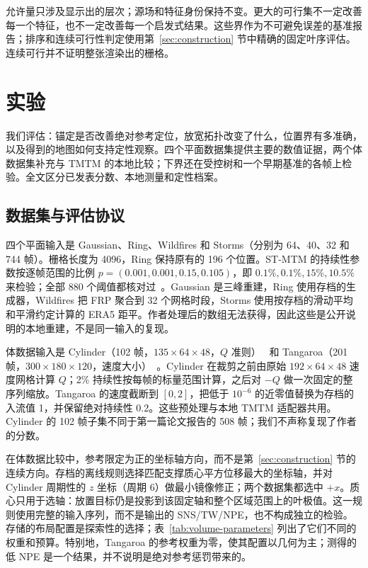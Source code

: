 \documentclass[fontset=none,zihao=5,a4paper]{ctexart}
\begin{document}
允许量只涉及显示出的层次；源场和特征身份保持不变。更大的可行集不一定改善每一个特征，也不一定改善每一个启发式结果。这些界作为不可避免误差的基准报告；排序和连续可行性判定使用第~\ref{sec:construction} 节中精确的固定叶序评估。连续可行并不证明整张渲染出的栅格。



\section{实验}\label{sec:experiments}
我们评估：锚定是否改善绝对参考定位，放宽拓扑改变了什么，位置界有多准确，以及得到的地图如何支持定性观察。四个平面数据集提供主要的数值证据，两个体数据集补充与 TMTM 的本地比较；下界还在受控树和一个早期基准的各帧上检验。全文区分已发表分数、本地测量和定性档案。


\subsection{数据集与评估协议}
四个平面输入是 Gaussian、Ring、Wildfires 和 Storms（分别为 64、40、32 和 744 帧）。栅格长度为 4096，Ring 保持原有的 196 个位置。ST-MTM 的持续性参数按逐帧范围的比例 $p=(0.001,0.001,0.15,0.105)$，即 $0.1\%,0.1\%,15\%,10.5\%$ 来检验；全部 880 个阈值都核对过~\cite{STMTM:2026}。Gaussian 是三峰重建，Ring 使用存档的生成器，Wildfires 把 FRP 聚合到 32 个网格时段，Storms 使用按存档的滑动平均和平滑约定计算的 ERA5 距平。作者处理后的数组无法获得，因此这些是公开说明的本地重建，不是同一输入的复现。

体数据输入是 Cylinder（102 帧，$135\times64\times48$，$Q$ 准则）~\cite{Camarri:2005:Cylinder,Weinkauf:SquareCylinder} 和 Tangaroa（201 帧，$300\times180\times120$，速度大小）~\cite{Popinet:2004:Tangaroa}。Cylinder 在裁剪之前由原始 $192\times64\times48$ 速度网格计算 $Q$；2\% 持续性按每帧的标量范围计算，之后对 $-Q$ 做一次固定的整序列缩放。Tangaroa 的速度截断到 $[0,2]$，把低于 $10^{-6}$ 的近零值替换为存档的入流值 1，并保留绝对持续性 0.2。这些预处理与本地 TMTM 适配器共用。Cylinder 的 102 帧子集不同于第一篇论文报告的 508 帧；我们不声称复现了作者的分数。

在体数据比较中，参考限定为正的坐标轴方向，而不是第~\ref{sec:construction} 节的连续方向。存档的离线规则选择匹配支撑质心平方位移最大的坐标轴，并对 Cylinder 周期性的 $z$ 坐标（周期 6）做最小镜像修正；两个数据集都选中 $+x$。质心只用于选轴：放置目标仍是投影到该固定轴和整个区域范围上的叶极值。这一规则使用完整的输入序列，而不是输出的 SNS/TW/NPE，也不构成独立的检验。存储的布局配置是探索性的选择；表~\ref{tab:volume-parameters} 列出了它们不同的权重和预算。特别地，Tangaroa 的参考权重为零，使其配置以几何为主；测得的低 NPE 是一个结果，并不说明是绝对参考惩罚带来的。
\end{document}
